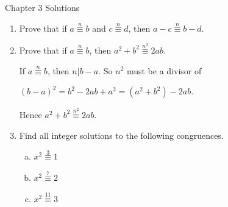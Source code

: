\documentclass[11pt,fleqn,dvipsnames,usenames]{article}
\renewcommand{\headrulewidth}{1pt}
\begin{document}
\fancyhead[L]{\course}
\fancyhead[R]{\term}
\renewcommand{\headrulewidth}{0.4pt}

{\huge Chapter 3 Solutions}
\vsp

\begin{enumerate}
\item Prove that if $a\overset{n}{\equiv}b$ and $c\overset{n}{\equiv}d$, then $a-c\overset{n}{\equiv}b-d$.
\item Prove that if $a\overset{n}{\equiv}b$, then $a^2 + b^2\overset{n^2}{\equiv}2ab$.
\vsmsp

\solution If $a\overset{n}{\equiv}b$, then $n|b-a$.  So $n^2$ must be a divisor of
\begin{center}
$(b-a)^2 = b^2 - 2ab + a^2 = (a^2 + b^2) - 2ab$.
\end{center}
Hence $a^2 + b^2\overset{n^2}{\equiv}2ab$.
\item Find all integer solutions to the following congruences.
\begin{multicols}{3}
\begin{enumerate}[(a)]
\item $x^2\overset{3}{\equiv}1$
\item $x^2\overset{7}{\equiv}2$
\item $x^2\overset{11}{\equiv}3$
\end{enumerate}
\end{multicols}
\vsmsp


\end{enumerate}
\end{document}
